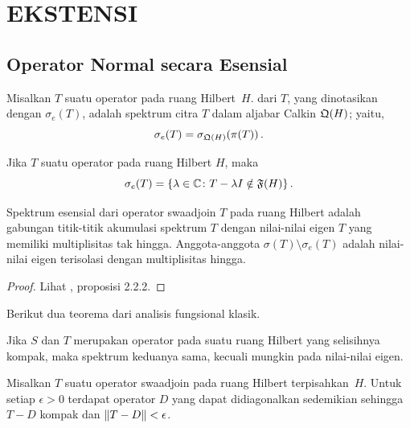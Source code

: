 \chapter{EKSTENSI}

\section{Operator Normal secara Esensial}
\begin{defn} Misalkan $T$ suatu operator pada ruang Hilbert~$H$.  
 dari $T$, yang dinotasikan dengan $\sigma_e(T)$, adalah spektrum citra
$T$ dalam aljabar Calkin $\mathfrak{Q}(H)$; yaitu,
   \[ \sigma_e(T) = \sigma_{\mathfrak{Q}(H)}(\pi(T))\,. \]
\end{defn}

\begin{prop} Jika $T$ suatu operator pada ruang Hilbert $H$, maka
  \[ \sigma_e(T) = \{\lambda \in \mathbb{C}\colon T - \lambda I \notin \mathfrak{F}(H)\}\,. \]
\end{prop}

\begin{prop} Spektrum esensial dari operator swaadjoin $T$ pada ruang Hilbert adalah gabungan
titik-titik akumulasi spektrum $T$ dengan nilai-nilai eigen $T$ yang memiliki
multiplisitas tak hingga.  Anggota-anggota $\sigma(T) \setminus \sigma_e(T)$ adalah nilai-nilai eigen
terisolasi dengan multiplisitas hingga.
\end{prop}

\begin{proof} Lihat \cite{HigsonR:2000}, proposisi 2.2.2. \ns \end{proof}

Berikut dua teorema dari analisis fungsional klasik.

\begin{thm}[Weyl]\label{005121} Jika $S$ dan $T$ merupakan operator pada suatu ruang Hilbert
yang selisihnya kompak, maka spektrum keduanya sama, kecuali mungkin pada nilai-nilai eigen.
\end{thm}

\begin{thm}\label{005124} Misalkan $T$ suatu operator swaadjoin pada
ruang Hilbert terpisahkan~$H$. Untuk setiap $\epsilon > 0$ terdapat operator $D$ yang dapat
didiagonalkan sedemikian sehingga $T - D$ kompak dan $\lVert T - D\rVert < \epsilon$.
\end{thm}


